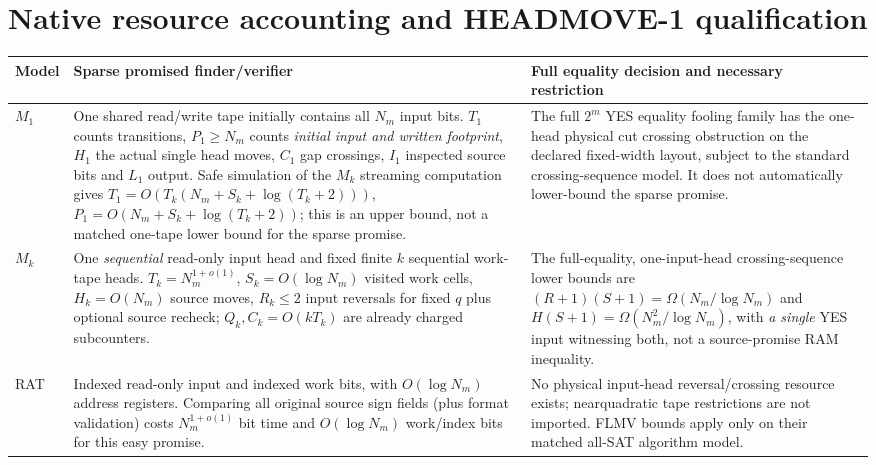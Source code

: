 \documentclass[11pt]{article}
\begin{document}
\section{Native resource accounting and HEADMOVE-1 qualification}
\begin{center}\begin{tabular}{p{.11\linewidth}p{.39\linewidth}p{.42\linewidth}}\toprule
Model & Sparse promised finder/verifier & Full equality decision and necessary restriction\\\midrule
$M_1$ & One shared read/write tape initially contains all $N_m$ input bits. $T_1$ counts transitions, $P_1\ge N_m$ counts \emph{initial input and written footprint}, $H_1$ the actual single head moves, $C_1$ gap crossings, $I_1$ inspected source bits and $L_1$ output. Safe simulation of the $M_k$ streaming computation gives $T_1=O(T_k(N_m+S_k+\log(T_k+2)))$, $P_1=O(N_m+S_k+\log(T_k+2))$; this is an upper bound, not a matched one-tape lower bound for the sparse promise. & The full $2^m$ YES equality fooling family has the one-head physical cut crossing obstruction on the declared fixed-width layout, subject to the standard crossing-sequence model. It does not automatically lower-bound the sparse promise.\\
$M_k$ & One \emph{sequential} read-only input head and fixed finite $k$ sequential work-tape heads. $T_k=N_m^{1+o(1)}$, $S_k=O(\log N_m)$ visited work cells, $H_k=O(N_m)$ source moves, $R_k\le2$ input reversals for fixed $q$ plus optional source recheck; $Q_k,C_k=O(kT_k)$ are already charged subcounters. & The full-equality, one-input-head crossing-sequence lower bounds are $(R+1)(S+1)=\Omega(N_m/\log N_m)$ and $H(S+1)=\Omega(N_m^2/\log N_m)$, with \emph{a single} YES input witnessing both, not a source-promise RAM inequality.\\
RAT & Indexed read-only input and indexed work bits, with $O(\log N_m)$ address registers. Comparing all original source sign fields (plus format validation) costs $N_m^{1+o(1)}$ bit time and $O(\log N_m)$ work/index bits for this easy promise. & No physical input-head reversal/crossing resource exists; nearquadratic tape restrictions are not imported. FLMV bounds apply only on their matched all-SAT algorithm model.\\\bottomrule\end{tabular}\end{center}
\end{document}

